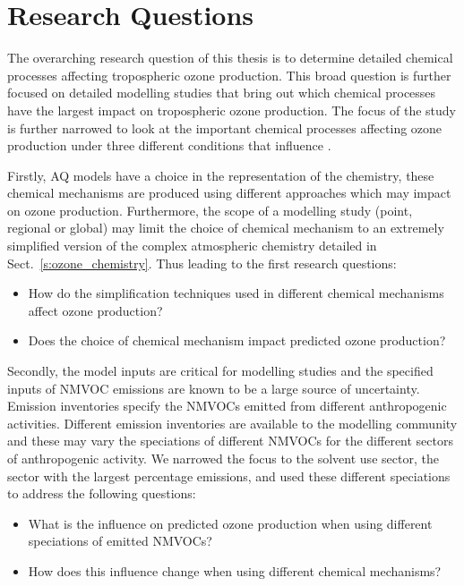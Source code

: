 \section{Research Questions} \label{s:research_questions}
The overarching research question of this thesis is to determine detailed chemical processes affecting tropospheric ozone production.
This broad question is further focused on detailed modelling studies that bring out which chemical processes have the largest impact on tropospheric ozone production.
The focus of the study is further narrowed to look at the important chemical processes affecting ozone production under three different conditions that influence .

Firstly, AQ models have a choice in the representation of the chemistry, these chemical mechanisms are produced using different approaches which may impact on ozone production.
Furthermore, the scope of a modelling study (point, regional or global) may limit the choice of chemical mechanism to an extremely simplified version of the complex atmospheric chemistry detailed in Sect.~\ref{s:ozone_chemistry}.
Thus leading to the first research questions:
\begin{itemize}
	\item How do the simplification techniques used in different chemical mechanisms affect ozone production? 
    \item Does the choice of chemical mechanism impact predicted ozone production?
\end{itemize}

Secondly, the model inputs are critical for modelling studies and the specified inputs of NMVOC emissions are known to be a large source of uncertainty.
Emission inventories specify the NMVOCs emitted from different anthropogenic activities.
Different emission inventories are available to the modelling community and these may vary the speciations of different NMVOCs for the different sectors of anthropogenic activity.
We narrowed the focus to the solvent use sector, the sector with the largest percentage emissions, and used these different speciations to address the following questions:
\begin{itemize}
	\item What is the influence on predicted ozone production when using different speciations of emitted NMVOCs? 
    \item How does this influence change when using different chemical mechanisms?
\end{itemize}

